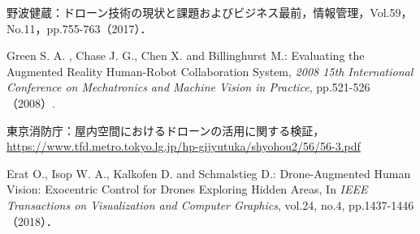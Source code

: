\documentclass[a4paper,10pt,twocolumn,uplatex]{jsarticle}
\begin{document}
\footnotesize{
  \begin{thebibliography}{99}
    野波健蔵：ドローン技術の現状と課題およびビジネス最前，情報管理，Vol.59，No.11，pp.755-763（2017）．
    
    Green S. A. , Chase J. G., Chen X. and Billinghurst M.: Evaluating the Augmented Reality Human-Robot Collaboration System, 
    {\it 2008 15th International Conference on Mechatronics and Machine Vision in Practice}, 
    pp.521-526（2008）.
    
    東京消防庁：屋内空間におけるドローンの活用に関する検証，\url{https://www.tfd.metro.tokyo.lg.jp/hp-gijyutuka/shyohou2/56/56-3.pdf}
    
    Erat O., Isop W. A., Kalkofen D. and Schmalstieg D.: Drone-Augmented Human Vision: Exocentric Control for Drones Exploring Hidden Areas, In 
    {\it IEEE Transactions on Visualization and Computer Graphics}, 
    vol.24, no.4, pp.1437-1446（2018）．

  \end{thebibliography}
}

% 
% 

\end{document}
